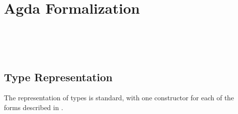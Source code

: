 \section{Agda Formalization}
\label{sec:formalization}

\begin{code}[hide]%
\>[0]\AgdaSpace{}%
\AgdaSpace{}%
\AgdaSpace{}%
\AgdaSpace{}%
\AgdaSymbol{(}\AgdaSymbol{;}\AgdaSpace{}%
\AgdaSymbol{)}\<%
\\
\>[0]\AgdaSpace{}%
\AgdaSpace{}%
\AgdaSpace{}%
\AgdaSpace{}%
\AgdaSymbol{(}\AgdaSymbol{;}\AgdaSpace{}%
\AgdaOperator{\AgdaInductiveConstructor{\AgdaUnderscore{},\AgdaUnderscore{}}}\AgdaSymbol{;}\AgdaSpace{}%
\AgdaSymbol{;}\AgdaSpace{}%
\AgdaSymbol{)}\<%
\\
\>[0]\AgdaSpace{}%
\AgdaSpace{}%
\AgdaSpace{}%
\AgdaSpace{}%
\AgdaSymbol{(}\AgdaSymbol{;}\AgdaSpace{}%
\AgdaSymbol{;}\AgdaSpace{}%
\AgdaSymbol{;}\AgdaSpace{}%
\AgdaSymbol{)}\<%
\\
\>[0]\AgdaSpace{}%
\AgdaSpace{}%
\AgdaSpace{}%
\AgdaSpace{}%
\AgdaSymbol{(}\AgdaSymbol{;}\AgdaSpace{}%
\AgdaInductiveConstructor{[]}\AgdaSymbol{;}\AgdaSpace{}%
\AgdaSymbol{;}\AgdaSpace{}%
\AgdaOperator{\AgdaFunction{[\AgdaUnderscore{}]}}\AgdaSymbol{;}\AgdaSpace{}%
\AgdaOperator{\AgdaFunction{\AgdaUnderscore{}++\AgdaUnderscore{}}}\AgdaSymbol{)}\<%
\end{code}

\subsection{Type Representation}
\label{sec:type-agda}

The representation of types is standard, with one constructor for each of the
forms described in .

